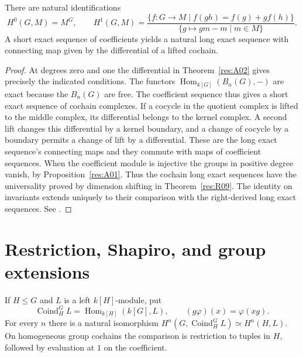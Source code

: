 \begin{corollary}
\label{res:A03}
There are natural identifications
\[
 H^0(G,M)=M^G,\qquad
 H^1(G,M)=
 \frac{\{f:G\to M\mid f(gh)=f(g)+g f(h)\}}
      {\{g\mapsto g m-m\mid m\in M\}} .
\]
A short exact sequence of coefficients yields a natural long exact
sequence with connecting map given by the differential of a lifted cochain.
\end{corollary}

\begin{proof}
At degrees zero and one the differential in
Theorem~\ref{res:A02} gives precisely the indicated conditions.
The functors \(\operatorname{Hom}_{k[G]}(B_n(G),-)\) are exact because
the \(B_n(G)\) are free. The coefficient sequence thus gives a short
exact sequence of cochain complexes. If a cocycle in the quotient
complex is lifted to the middle complex, its differential belongs to
the kernel complex. A second lift changes this differential by a
kernel boundary, and a change of cocycle by a boundary permits a
change of lift by a differential. These are the long exact sequence's
connecting maps and they commute with maps of coefficient
sequences. When the coefficient module is injective the groups in
positive degree vanish, by Proposition~\ref{res:A01}. Thus the
cochain long exact sequences have the universality proved by
dimension shifting in Theorem~\ref{res:R09}. The identity on
invariants extends uniquely to their comparison with the
right-derived long exact sequences. See
\cite[Sections 6.1 and 6.4]{weibel}.
\end{proof}

\section{Restriction, Shapiro, and group extensions}

\begin{theorem}\label{res:A04}
If \(H\leq G\) and \(L\) is a left \(k[H]\)-module, put
\[
 \operatorname{Coind}_H^G L=\operatorname{Hom}_{k[H]}(k[G],L),
 \qquad (g\varphi)(x)=\varphi(xg).
\]
For every \(n\) there is a natural isomorphism
\(H^n(G,\operatorname{Coind}_H^GL)\simeq H^n(H,L)\). On
homogeneous group cochains the comparison is restriction to tuples
in \(H\), followed by evaluation at \(1\) on the coefficient.
\end{theorem}

